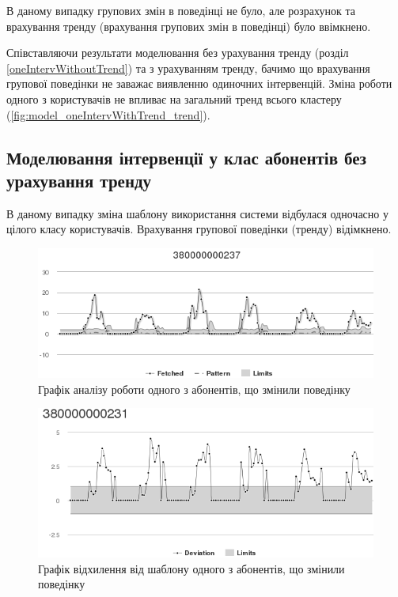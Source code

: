В даному випадку групових змін в поведінці не було, але розрахунок та врахування тренду (врахування групових змін в поведінці) було ввімкнено.

Співставляючи результати моделювання без урахування тренду (розділ \ref{oneIntervWithoutTrend}) та з урахуванням тренду, бачимо що врахування групової поведінки не заважає виявленню одиночних інтервенцій. Зміна роботи одного з користувачів не впливає на загальний тренд всього кластеру (\autoref{fig:model_oneIntervWithTrend_trend}).

\subsection{Моделювання інтервенції у клас абонентів без урахування тренду}
\label{classWithoutTrend}
В даному випадку зміна шаблону використання системи відбулася одночасно у цілого класу користувачів. Врахування групової поведінки (тренду) відімкнено.

\begin{figure}[h!]
        \begin{center}
            \includegraphics[scale=0.55]{resources/classIntervWithoutTrend/analysis.png}
        \end{center}
        \caption{Графік аналізу роботи одного з абонентів, що змінили поведінку}
        \label{fig:model_classIntervWithoutTrend_analytics}
\end{figure}

\begin{figure}[h!]
        \begin{center}
            \includegraphics[scale=0.55]{resources/classIntervWithoutTrend/dev.png}
        \end{center}
        \caption{Графік відхилення від шаблону одного з абонентів, що змінили поведінку}
        \label{fig:model_classIntervWithoutTrend_dev}
\end{figure}

